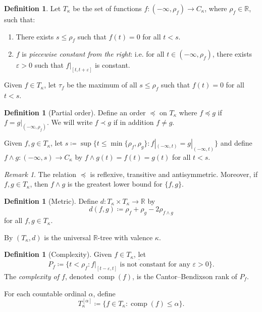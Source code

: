\documentclass[11pt]{article}
\DeclareMathOperator{\comp}{comp}
\theoremstyle{definition}
\newtheorem{definition}[theorem]{Definition}
\theoremstyle{remark}
\newtheorem{remark}[theorem]{Remark}
\begin{document}
\begin{definition}
    Let $T_\kappa$ be the set of functions $f: (-\infty, \rho_f) \rightarrow C_\kappa$, where $\rho_f \in \mathbb{R}$, such that:
    \begin{enumerate}
        \item There exists $s \leq \rho_f$ such that $f(t) = 0$ for all $t < s$.
        \item $f$ is \textit{piecewise constant from the right}: i.e. for all $t \in (-\infty, \rho_f)$, there exists $\varepsilon > 0$ such that $f|_{[t, t+\varepsilon]}$ is constant.
    \end{enumerate}
    Given $f \in T_\kappa$, let $\tau_f$ be the maximum of all $s \leq \rho_f$ such that $f(t) = 0$ for all $t < s$. 
\end{definition}

\begin{definition}[Partial order]
	Define an order $\preceq$ on $T_\kappa$ where $f \preceq g$ if $f = g|_{(-\infty, \rho_f)}$. We will write $f \prec g$ if in addition $f \neq g$.
	
	Given $f,g \in T_\kappa$, let $s \coloneqq \sup\{t \leq \min\{\rho_f, \rho_g\} : f|_{(-\infty,t)} = g|_{(-\infty, t)}\}$ and define $f \wedge g: (-\infty, s) \rightarrow C_\kappa$ by $f \wedge g(t) = f(t) = g(t)$ for all $t < s$.
\end{definition}

\begin{remark}
    The relation $\preceq$ is reflexive, transitive and antisymmetric. Moreover, if $f, g \in T_\kappa$, then $f \wedge g$ is the greatest lower bound for $\{f,g\}$. 
\end{remark}

\begin{definition}[Metric]
    Define $d:T_\kappa \times T_\kappa \rightarrow \mathbb{R}$ by 
    \[
        d(f,g) \coloneqq \rho_f + \rho_g - 2\rho_{f \wedge g}
    \]
    for all $f,g \in T_\kappa$.
\end{definition}

By \cite[Theorem~1.1.3]{DyubinaExplicit01} $(T_\kappa, d)$ is the universal $\mathbb{R}$-tree with valence $\kappa$.

\begin{definition}[Complexity] \label{def: tka}
    Given $f \in T_\kappa$, let 
    \[
        P_f \coloneqq \overline{\{t < \rho_f : f|_{[t-\varepsilon, t]} \text{ is not constant for any } \varepsilon > 0\}}.
    \]
    The \textit{complexity of $f$}, denoted $\comp(f)$, is the Cantor--Bendixson rank of $P_f$.

    For each countable ordinal $\alpha$, define
    \[
        T_\kappa^{[\alpha]} \coloneqq \{f \in T_\kappa : \comp(f) \leq \alpha\}. 
    \]
\end{definition}
\end{document}
